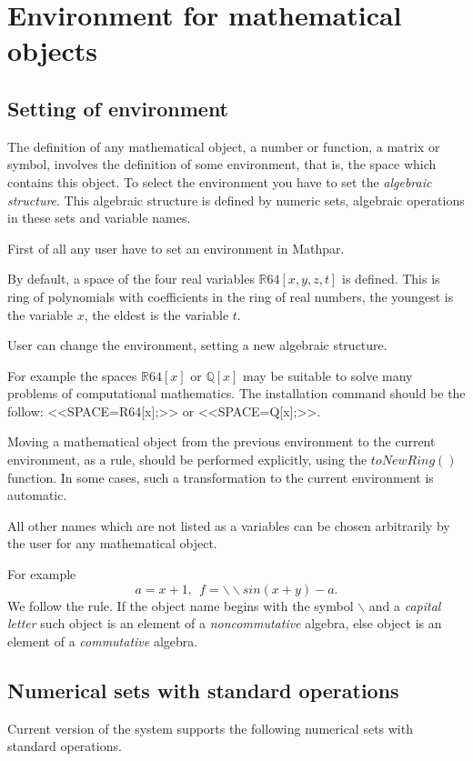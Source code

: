 \chapter{Environment for mathematical objects}
\section{Setting of environment}

The definition of any mathematical object, a number or function, a matrix or symbol, involves the definition of some environment, that is, the space which contains this object. 
To select the environment you have to set the {\it algebraic structure}.  
This algebraic structure is defined by numeric sets, algebraic operations in these sets and variable names.

First of all any user have to set an environment in Mathpar.

By default, a space of the four real variables $\mathbb{R}64[x,y,z,t]$ is defined. This is ring of polynomials with   coefficients in the ring of real numbers, the youngest is the variable  $ x $, the eldest is the variable $ t $.

User can change the environment, setting a new algebraic structure. 
 

For example the spaces $\mathbb{R}64[x]$ or $\mathbb{Q}[x]$ may be suitable to solve many problems of computational mathematics. 
The installation  command should be the follow: <<SPACE=R64[x];>> or <<SPACE=Q[x];>>. 

 
Moving a mathematical object from the previous environment to the current environment, as a rule, should be performed explicitly, using the $ toNewRing()$ function.  In some cases, such a transformation to the current environment is automatic. 
 
All other names which are not listed as a variables can be chosen arbitrarily by the user for any mathematical object.   

For example
$$a=x+1, \ \  f= \backslash \backslash sin(x+y) - a.$$
We follow the rule.
  If the object name begins with the symbol $\backslash$ and a {\it   capital letter} such object is an element of a {\it noncommutative} algebra, else object is an element of a  {\it   commutative} algebra.

\section{Numerical sets with standard operations} 
Current version of the system supports the following numerical sets with standard operations.

